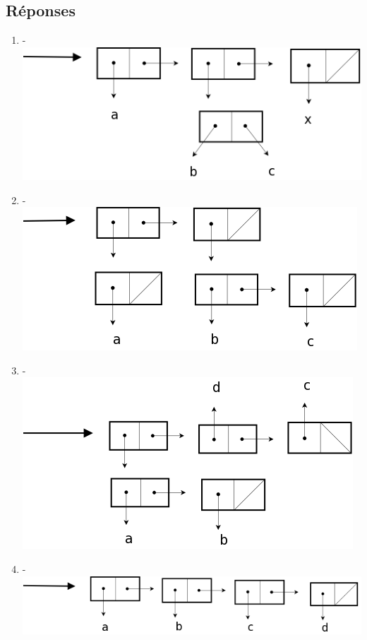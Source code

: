 \documentclass[a4paper, 11pt]{article}
\begin{document}
\subsection{Réponses}
\begin{enumerate}
    \item -\\ \includegraphics[scale=0.3]{reponse1.png}
    \item -\\ \includegraphics[scale=0.3]{reponse2.png}
    \item -\\ \includegraphics[scale=0.3]{reponse3.png}
    \item -\\ \includegraphics[scale=0.3]{reponse4.png}

\end{enumerate}
\end{document}
